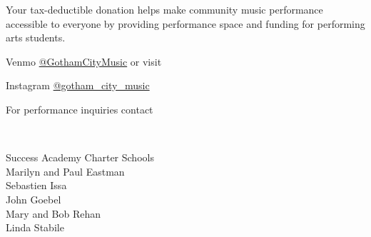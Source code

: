\documentclass{article}[10pt]
\begin{document}
\begin{center}
\begin{minipage}{4in}
            \begin{small}
                Your tax-deductible donation helps make community music performance accessible to everyone by providing performance space and funding for performing arts students.\\
            \end{small}


            Venmo \href{https://account.venmo.com/u/GothamCityMusic}{@GothamCityMusic} or visit \textbf{}

            \begin{center}
            {\textbf{}}

                \faInstagram{}{}  Instagram  \href{https://www.instagram.com/gotham_city_music/}{@gotham\_city\_music}

                For performance inquiries contact
                    {\textbf{}}
            \end{center}

            \begin{center}
            {\textbf{}}
                \\

                \begin{small}
                    \vspace{-0.11in}
                    \begin{multicols*}{2}
                    {Success Academy Charter Schools}
                        \\
                        Marilyn and Paul Eastman\\
                        Sebastien Issa\\
                        John Goebel\\
                        Mary and Bob Rehan\\
                        Linda Stabile
                    \end{multicols*}
                \end{small}
            \end{center}

        \end{minipage}

    \end{center}
\end{document}
